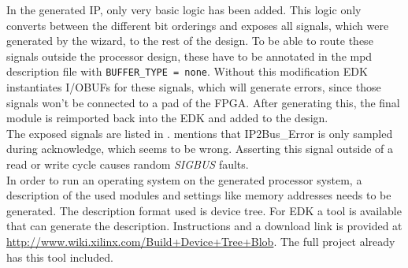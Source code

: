 \documentclass[11pt,technote,a4paper,onecolumn,dvips]{IEEEtran}
\newcommand{\signal}[1]{{\ttfamily #1}}
\begin{document}
In the generated IP, only very basic logic has been added. This logic only
converts between the different bit orderings and exposes all signals, which
were generated by the wizard, to the rest of the design. To be able to route
these signals outside the processor design, these have to be annotated in the
mpd description file with \lstinline+BUFFER_TYPE = none+. Without this modification
EDK instantiates I/OBUFs for these signals, which will generate errors,
since those signals won't be connected to a pad of the FPGA. After generating
this, the final module is reimported back into the EDK and added to the
design.\\
The exposed signals are listed in \cite{slave_burst}. \cite[p. 14]{slave_burst}
mentions that \signal{IP2Bus\_Error} is only sampled during acknowledge, which
seems to be wrong. Asserting this signal outside of a read or write cycle
causes random \emph{SIGBUS} faults.\\
In order to run an operating system on the generated processor system, a
description of the used modules and settings like memory addresses needs to be
generated. The description format used is device tree\cite{dt}. For EDK a tool
is available that can generate the description. Instructions and a download
link is provided at \url{http://www.wiki.xilinx.com/Build+Device+Tree+Blob}.
The full project already has this tool included.
\end{document}
